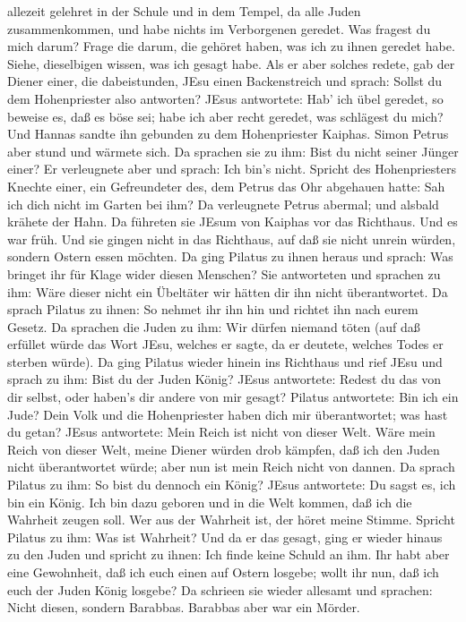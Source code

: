 allezeit gelehret in der Schule und in dem Tempel, da alle Juden
zusammenkommen, und habe nichts im Verborgenen geredet. 
Was fragest du mich darum? Frage die darum, die gehöret haben, was ich
zu ihnen geredet habe. Siehe, dieselbigen wissen, was ich gesagt habe.
 Als er aber solches redete, gab der Diener einer, die
dabeistunden, JEsu einen Backenstreich und sprach: Sollst du dem
Hohenpriester also antworten?  JEsus antwortete: Hab' ich
übel geredet, so beweise es, daß es böse sei; habe ich aber recht
geredet, was schlägest du mich?  Und Hannas sandte ihn
gebunden zu dem Hohenpriester Kaiphas.  Simon Petrus aber
stund und wärmete sich. Da sprachen sie zu ihm: Bist du nicht seiner
Jünger einer? Er verleugnete aber und sprach: Ich bin's nicht.
 Spricht des Hohenpriesters Knechte einer, ein Gefreundeter
des, dem Petrus das Ohr abgehauen hatte: Sah ich dich nicht im Garten
bei ihm?  Da verleugnete Petrus abermal; und alsbald
krähete der Hahn.  Da führeten sie JEsum von Kaiphas vor
das Richthaus. Und es war früh. Und sie gingen nicht in das Richthaus,
auf daß sie nicht unrein würden, sondern Ostern essen möchten.
 Da ging Pilatus zu ihnen heraus und sprach: Was bringet
ihr für Klage wider diesen Menschen?  Sie antworteten und
sprachen zu ihm: Wäre dieser nicht ein Übeltäter wir hätten dir ihn
nicht überantwortet.  Da sprach Pilatus zu ihnen: So nehmet
ihr ihn hin und richtet ihn nach eurem Gesetz. Da sprachen die Juden zu
ihm: Wir dürfen niemand töten  (auf daß erfüllet würde das
Wort JEsu, welches er sagte, da er deutete, welches Todes er sterben
würde).  Da ging Pilatus wieder hinein ins Richthaus und
rief JEsu und sprach zu ihm: Bist du der Juden König? 
JEsus antwortete: Redest du das von dir selbst, oder haben's dir andere
von mir gesagt?  Pilatus antwortete: Bin ich ein Jude? Dein
Volk und die Hohenpriester haben dich mir überantwortet; was hast du
getan?  JEsus antwortete: Mein Reich ist nicht von dieser
Welt. Wäre mein Reich von dieser Welt, meine Diener würden drob kämpfen,
daß ich den Juden nicht überantwortet würde; aber nun ist mein Reich
nicht von dannen.  Da sprach Pilatus zu ihm: So bist du
dennoch ein König? JEsus antwortete: Du sagst es, ich bin ein König. Ich
bin dazu geboren und in die Welt kommen, daß ich die Wahrheit zeugen
soll. Wer aus der Wahrheit ist, der höret meine Stimme. 
Spricht Pilatus zu ihm: Was ist Wahrheit? Und da er das gesagt, ging er
wieder hinaus zu den Juden und spricht zu ihnen: Ich finde keine Schuld
an ihm.  Ihr habt aber eine Gewohnheit, daß ich euch einen
auf Ostern losgebe; wollt ihr nun, daß ich euch der Juden König losgebe?
 Da schrieen sie wieder allesamt und sprachen: Nicht
diesen, sondern Barabbas. Barabbas aber war ein Mörder.

